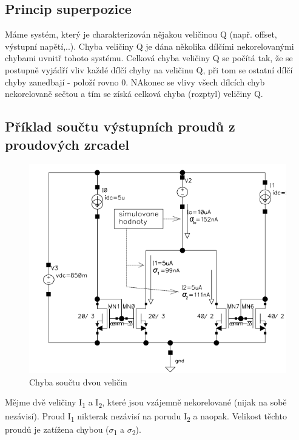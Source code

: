 \subsection{Princip superpozice}
Máme systém, který je charakterizován nějakou veličinou Q (např. offset, výstupní napětí,..). Chyba veličiny Q je dána několika dílčími nekorelovanými chybami uvnitř tohoto systému. Celková chyba veličiny Q se počítá tak, že se postupně vyjádří vliv každé dílčí chyby na veličinu Q, při tom se ostatní dílčí chyby zanedbají - položí rovno 0. NAkonec se vlivy všech dílcích chyb nekorelovaně sečtou a tím se získá celková chyba (rozptyl) veličiny Q.

\subsection{Příklad součtu výstupních proudů z proudových zrcadel}

\begin{figure}[h]
   \begin{center}
     \includegraphics[scale=0.5]{images/Chyba_Souctu.png}
   \end{center}
   \caption{Chyba součtu dvou veličin}
\end{figure}

Mějme dvě veličiny I\textsubscript{1} a I\textsubscript{2}, které jsou vzájemně nekorelované (nijak na sobě nezávisí). Proud I\textsubscript{1} nikterak nezávisí na porudu I\textsubscript{2} a naopak. Velikost těchto proudů je zatížena chybou ($\sigma$\textsubscript{1} a $\sigma$\textsubscript{2}).

